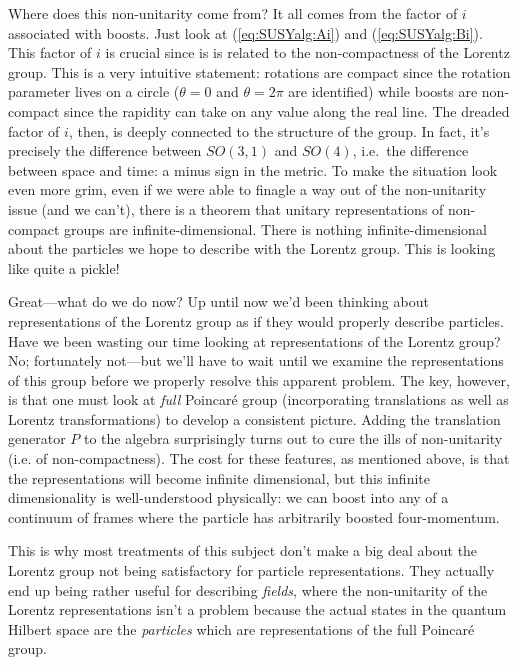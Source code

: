 Where does this non-unitarity come from? It all comes from the factor of $i$ associated with boosts. Just look at (\ref{eq:SUSYalg:Ai}) and (\ref{eq:SUSYalg:Bi}). This factor of $i$ is crucial since is is related to the non-compactness of the Lorentz group. This is a very intuitive statement: rotations are compact since the rotation parameter lives on a circle ($\theta=0$ and $\theta=2\pi$ are identified) while boosts are non-compact since the rapidity can take on any value along the real line. The dreaded factor of $i$, then, is deeply connected to the structure of the group. In fact, it's precisely the difference between $SO(3,1)$ and $SO(4)$, i.e.\ the difference between space and time: a minus sign in the metric. To make the situation look even more grim, even if we were able to finagle a way out of the non-unitarity issue (and we can't), there is a theorem that unitary representations of non-compact groups are infinite-dimensional. There is nothing infinite-dimensional about the particles we hope to describe with the Lorentz group. This is looking like quite a pickle!

Great---what do we do now? Up until now we'd been thinking about representations of the Lorentz group as if they would properly describe particles. Have we been wasting our time looking at representations of the Lorentz group? No; fortunately not---but we'll have to wait until we examine the representations of this group before we properly resolve this apparent problem. The key, however, is that one must look at \textit{full} Poincar\'e group (incorporating translations as well as Lorentz transformations) to develop a consistent picture. Adding the translation generator $P$ to the algebra surprisingly turns out to cure the ills of non-unitarity (i.e. of non-compactness). The cost for these features, as mentioned above, is that the representations will become infinite dimensional, but this infinite dimensionality is well-understood physically: we can boost into any of a continuum of frames where the particle has arbitrarily boosted four-momentum. %

This is why most treatments of this subject don't make a big deal about the Lorentz group not being satisfactory for particle representations. They actually end up being rather useful for describing \textit{fields}, where the non-unitarity of the Lorentz representations isn't a problem because the actual states in the quantum Hilbert space are the \textit{particles} which are representations of the full Poincar\'e group. %

